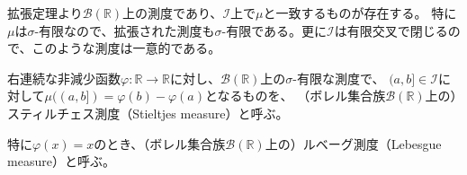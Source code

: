\documentclass[../root.tex]{subfiles}
\begin{document}
拡張定理より$ \mathscr{B}( \mathbb{R} ) $上の測度であり、$ \mathscr{I} $上で$ \mu $と一致するものが存在する。
特に$ \mu $は$ \sigma $-有限なので、拡張された測度も$ \sigma $-有限である。更に$ \mathscr{I} $は有限交叉で閉じるので、このような測度は一意的である。

\begin{Def}{}{}
右連続な非減少函数$ \varphi\colon\mathbb{R}\rightarrow\mathbb{R} $に対し、$ \mathscr{B}( \mathbb{R} ) $上の$ \sigma $-有限な測度で、
$ ( a, b \rbrack\in\mathscr{I} $に対して$ \mu( ( a, b \rbrack )=\varphi( b )-\varphi( a ) $となるものを、
（ボレル集合族$ \mathscr{B}( \mathbb{R} ) $上の）スティルチェス測度（Stieltjes measure）と呼ぶ。

特に$ \varphi( x )=x $のとき、（ボレル集合族$ \mathscr{B}( \mathbb{R} ) $上の）ルベーグ測度（Lebesgue measure）と呼ぶ。
\end{Def}
\end{document}
